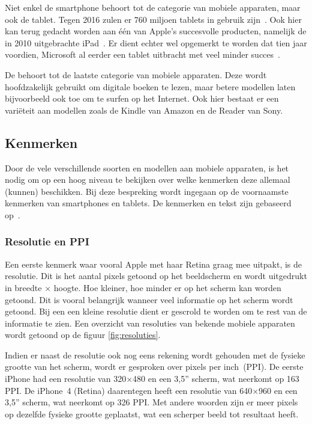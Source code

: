 Niet enkel de smartphone behoort tot de categorie van mobiele apparaten, maar ook de tablet. 
Tegen 2016 zulen er 760 miljoen tablets in gebruik zijn~\cite{Gillett2012}.
Ook hier kan terug gedacht worden aan één van Apple's succesvolle producten, namelijk de in 2010 uitgebrachte iPad~\cite{Apple2010}. 
Er dient echter wel opgemerkt te worden dat tien jaar voordien, Microsoft al eerder een tablet uitbracht met veel minder succes~\cite{Microsoft2000}.

De  behoort tot de laatste categorie van mobiele apparaten. 
Deze wordt hoofdzakelijk gebruikt om digitale boeken te lezen, maar betere modellen laten bijvoorbeeld ook toe om te surfen op het Internet. 
Ook hier bestaat er een variëteit aan modellen zoals de Kindle van Amazon en de Reader van Sony.

\subsection{Kenmerken}
Door de vele verschillende soorten en modellen aan mobiele apparaten, is het nodig om op een hoog niveau te bekijken over welke kenmerken deze allemaal (kunnen) beschikken. 
Bij deze bespreking wordt ingegaan op de voornaamste kenmerken van smartphones en tablets. 
De kenmerken en tekst zijn gebaseerd op~\cite{PhilDutson2012}.

\subsubsection{Resolutie en PPI}
Een eerste kenmerk waar vooral Apple met haar Retina graag mee uitpakt, is de resolutie. 
Dit is het aantal pixels getoond op het beeldscherm en wordt uitgedrukt in breedte $\times$ hoogte. 
Hoe kleiner, hoe minder er op het scherm kan worden getoond. 
Dit is vooral belangrijk wanneer veel informatie op het scherm wordt getoond. 
Bij een een kleine resolutie dient er gescrold te worden om te rest van de informatie te zien.
Een overzicht van resoluties van bekende mobiele apparaten wordt getoond op de figuur \ref{fig:resoluties}.

Indien er naast de resolutie ook nog eens rekening wordt gehouden met de fysieke grootte van het scherm, wordt er gesproken over pixels per inch~(PPI). 
De eerste iPhone had een resolutie van 320$\times$480 en een 3,5” scherm, wat neerkomt op 163 PPI. 
De iPhone~4 (Retina) daarentegen heeft een resolutie van 640$\times$960 en een 3,5” scherm, wat neerkomt op 326 PPI. 
Met andere woorden zijn er meer pixels op dezelfde fysieke grootte geplaatst, wat een scherper beeld tot resultaat heeft. 

